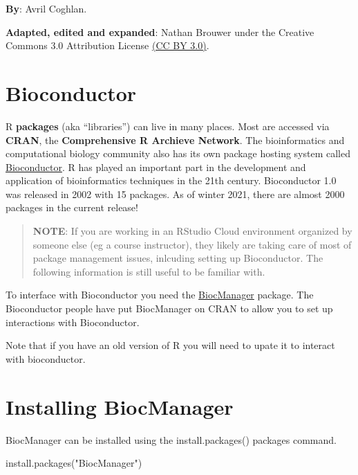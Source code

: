 \documentclass[
]{book}
\newenvironment{Shaded}{\begin{snugshade}}{\end{snugshade}}
\newcommand{\FunctionTok}[1]{\textcolor[rgb]{0.00,0.00,0.00}{#1}}
\newcommand{\NormalTok}[1]{#1}
\newcommand{\StringTok}[1]{\textcolor[rgb]{0.31,0.60,0.02}{#1}}
\begin{document}
\textbf{By}: Avril Coghlan.

\textbf{Adapted, edited and expanded}: Nathan Brouwer under the Creative Commons 3.0 Attribution License \href{https://creativecommons.org/licenses/by/3.0/}{(CC BY 3.0)}.

\hypertarget{bioconductor}{%
\section{Bioconductor}\label{bioconductor}}

R \textbf{packages} (aka ``libraries'') can live in many places. Most are accessed via \textbf{CRAN}, the \textbf{Comprehensive R Archieve Network}. The bioinformatics and computational biology community also has its own package hosting system called \href{www.bioconductor.org}{Bioconductor}. R has played an important part in the development and application of bioinformatics techniques in the 21th century. Bioconductor 1.0 was released in 2002 with 15 packages. As of winter 2021, there are almost 2000 packages in the current release!

\begin{quote}
\textbf{NOTE}: If you are working in an RStudio Cloud environment organized by someone else (eg a course instructor), they likely are taking care of most of package management issues, inlcuding setting up Bioconductor. The following information is still useful to be familiar with.
\end{quote}

To interface with Bioconductor you need the \href{https://cran.r-project.org/web/packages/BiocManager/vignettes/BiocManager.html}{BiocManager} package. The Bioconductor people have put BiocManager on CRAN to allow you to set up interactions with Bioconductor.

Note that if you have an old version of R you will need to upate it to interact with bioconductor.

\hypertarget{installing-biocmanager}{%
\section{Installing BiocManager}\label{installing-biocmanager}}

BiocManager can be installed using the install.packages() packages command.

\begin{Shaded}
\begin{Highlighting}[]
\FunctionTok{install.packages}\NormalTok{(}\StringTok{"BiocManager"}\NormalTok{)}
\end{Highlighting}
\end{Shaded}
\end{document}
